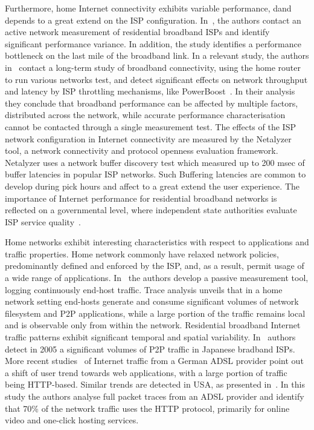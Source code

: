 Furthermore, home Internet connectivity exhibits variable performance, dand
depends to a great extend on the ISP configuration.
In~\cite{Dischinger2007}, the authors contact an active network measurement of
residential broadband ISPs and identify significant performance variance.
In addition,  the study identifies a performance bottleneck
on the last mile of the broadband link.  In a relevant study, the authors
in~\cite{Sundaresan2011} contact a long-term study of broadband connectivity,
using the home router to run various networks test, and detect significant
effects on network throughput and latency by ISP throttling mechanisms, like
PowerBoost~\cite{powerboost}. In their analysis they conclude that broadband
performance can be affected by multiple factors, distributed  across the
network, while accurate performance characterisation cannot be contacted through
a single measurement test.  The effects of the ISP network configuration in
Internet connectivity are measured by the Netalyzer~\cite{Kreibich10} tool, a
network connectivity and protocol openness evaluation framework.  Netalyzer uses
a network buffer discovery test which measured up to 200 msec of buffer
latencies in popular ISP networks. Such Buffering latencies are common to
develop during pick hours and affect to a great extend the user experience. 
The importance of Internet performance for residential broadband networks is
reflected on a governmental level, where independent state authorities evaluate
ISP service quality~\cite{fcc, ofcom}.  

Home networks exhibit interesting characteristics with respect to applications
and traffic properties. Home network commonly have relaxed network policies,
predominantly defined and enforced by the ISP, and, as a result, permit usage of
a wide range of applications.  In~\cite{Reggani12} the authors develop a passive
measurement tool, logging continuously end-host traffic.  Trace analysis unveils
that in a home network setting end-hosts generate and consume significant
volumes of network filesystem and P2P applications, while a large portion of the
traffic remains local and is observable only from within the network.
Residential broadband Internet traffic patterns exhibit significant temporal and
spatial variability.  In~\cite{Cho2006} authors detect in 2005 a significant
volumes of P2P traffic in Japanese bradband ISPs.  More recent
studies~\cite{Maier2009} of Internet traffic from a German ADSL provider point
out a shift of user trend towards web applications, with a large portion of
traffic being HTTP-based. Similar trends are detected in USA,  as presented
in~\cite{Erman2011}. In this study the authors analyse full packet traces from
an ADSL provider and identify that 70\% of the network traffic uses the HTTP
protocol, primarily for online video and one-click hosting services. 

